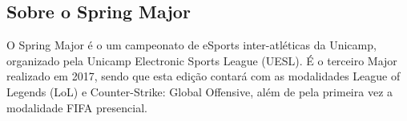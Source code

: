 \subsection{Sobre o Spring Major}

O Spring Major é o um campeonato de eSports inter-atléticas da Unicamp, organizado pela Unicamp Electronic Sports League (UESL). É o terceiro Major realizado em 2017, sendo que esta edição contará com as modalidades League of Legends (LoL) e Counter-Strike: Global Offensive, além de pela primeira vez a modalidade FIFA presencial.
